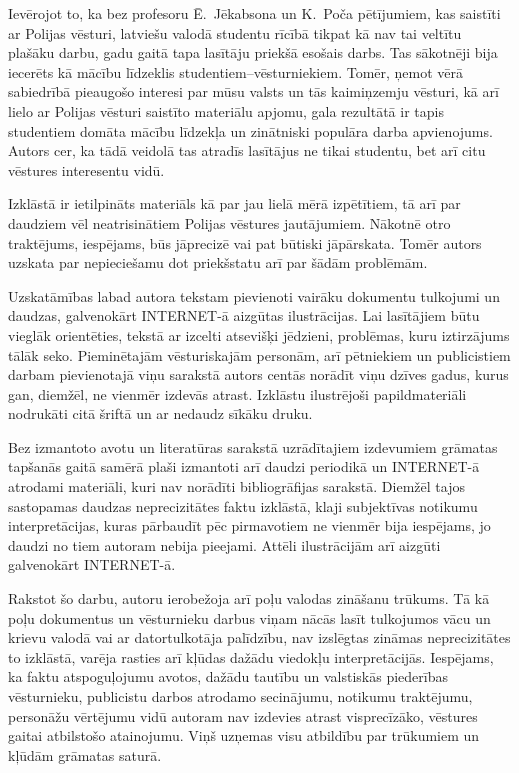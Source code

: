\documentclass[twoside,a5paper,12pt,fleqn,openany]{extbook}
\begin{document}
Ievērojot to, ka bez profesoru Ē.~Jēkabsona un K.~Poča pētījumiem, kas saistīti ar Polijas vēsturi, latviešu valodā studentu rīcībā tikpat kā nav tai veltītu plašāku darbu, gadu gaitā tapa lasītāju priekšā esošais darbs.
Tas sākotnēji bija iecerēts kā mācību līdzeklis studentiem--vēsturniekiem.
Tomēr, ņemot vērā sabiedrībā pieaugošo interesi par mūsu valsts un tās kaimiņzemju vēsturi, kā arī lielo ar Polijas vēsturi saistīto materiālu apjomu, gala rezultātā ir tapis studentiem domāta mācību līdzekļa un zinātniski populāra darba apvienojums.
Autors cer, ka tādā veidolā tas atradīs lasītājus ne tikai studentu, bet arī citu vēstures interesentu vidū.

Izklāstā ir ietilpināts materiāls kā par jau lielā mērā izpētītiem, tā arī par daudziem vēl neatrisinātiem Polijas vēstures jautājumiem.
Nākotnē otro traktējums, iespējams, būs jāprecizē vai pat būtiski jāpārskata.
Tomēr autors uzskata par nepieciešamu dot priekšstatu arī par šādām problēmām.

Uzskatāmības labad autora tekstam pievienoti vairāku dokumentu tulkojumi un daudzas, galvenokārt INTERNET-ā aizgūtas ilustrācijas.
Lai lasītājiem būtu vieglāk orientēties, tekstā ar  izcelti atsevišķi jēdzieni, problēmas, kuru iztirzājums tālāk seko.
Pieminētajām vēsturiskajām personām, arī pētniekiem un publicistiem darbam pievienotajā viņu sarakstā autors centās norādīt viņu dzīves gadus, kurus gan, diemžēl, ne vienmēr izdevās atrast.
Izklāstu ilustrējoši papildmateriāli nodrukāti citā šriftā un ar nedaudz sīkāku druku.

Bez izmantoto avotu un literatūras sarakstā uzrādītajiem izdevumiem grāmatas tapšanās gaitā samērā plaši izmantoti arī daudzi periodikā un INTERNET-ā atrodami materiāli, kuri nav norādīti bibliogrāfijas sarakstā.
Diemžēl tajos sastopamas daudzas neprecizitātes faktu izklāstā, klaji subjektīvas notikumu interpretācijas, kuras pārbaudīt pēc pirmavotiem ne vienmēr bija iespējams, jo daudzi no tiem autoram nebija pieejami.
Attēli ilustrācijām arī aizgūti galvenokārt INTERNET-ā.

Rakstot šo darbu, autoru ierobežoja arī poļu valodas zināšanu trūkums.
Tā kā poļu dokumentus un vēsturnieku darbus viņam nācās lasīt tulkojumos vācu un krievu valodā vai ar datortulkotāja palīdzību, nav izslēgtas zināmas neprecizitātes to izklāstā, varēja rasties arī kļūdas dažādu viedokļu interpretācijās.
Iespējams, ka faktu atspoguļojumu avotos, dažādu tautību un valstiskās piederības vēsturnieku, publicistu darbos atrodamo secinājumu, notikumu traktējumu, personāžu vērtējumu vidū autoram nav izdevies atrast visprecīzāko, vēstures gaitai atbilstošo atainojumu.
Viņš uzņemas visu atbildību par trūkumiem un kļūdām grāmatas saturā.
\end{document}
